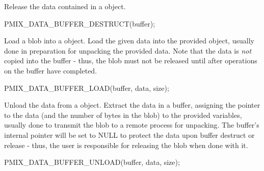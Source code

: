 Release the data contained in a  object.

\cspecificstart
\begin{codepar}
PMIX_DATA_BUFFER_DESTRUCT(buffer);
\end{codepar}
\cspecificend

\begin{arglist}
\end{arglist}



Load a blob into a  object.
Load the given data into the provided  object, usually done in preparation for unpacking the provided data. Note that the data is \textit{not} copied into the buffer - thus, the blob must not be released until after operations on the buffer have completed.

\cspecificstart
\begin{codepar}
PMIX_DATA_BUFFER_LOAD(buffer, data, size);
\end{codepar}
\cspecificend

\begin{arglist}
\end{arglist}


Unload the data from a  object.
Extract the data in a buffer, assigning the pointer to the data (and the number of bytes in the blob) to the provided variables, usually done to transmit the blob to a remote process for unpacking. The buffer's internal pointer will be set to NULL to protect the data upon buffer destruct or release - thus, the user is responsible for releasing the blob when done with it.

\cspecificstart
\begin{codepar}
PMIX_DATA_BUFFER_UNLOAD(buffer, data, size);
\end{codepar}
\cspecificend

\begin{arglist}
\end{arglist}


